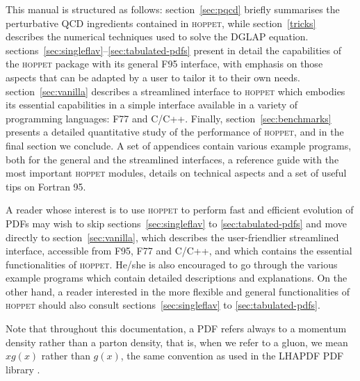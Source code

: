 \documentclass[12pt]{article}
\newcommand{\hoppet}{\textsc{hoppet}\xspace}
\begin{document}
This manual is structured as follows: section~\ref{sec:pqcd}
briefly summarises the perturbative QCD ingredients contained in
\hoppet, while section~\ref{tricks} describes the numerical techniques
used to solve the DGLAP equation. 
sections~\ref{sec:singleflav}--\ref{sec:tabulated-pdfs} present in detail the capabilities
of the \hoppet package with its general F95 interface, 
with emphasis on those aspects that
can be adapted by a user to tailor it to their own needs. 
section~\ref{sec:vanilla} describes a streamlined interface
to \hoppet which embodies its essential capabilities in
a simple interface available in a variety of programming languages: 
F77 and C/C++.
Finally, section~\ref{sec:benchmarks} presents a detailed 
quantitative study of
the performance of \hoppet, and in the final section we conclude.
A set of appendices contain various example programs,
both for the general and the streamlined interfaces, a reference
guide with the most important \hoppet modules,
details on technical aspects and a set of useful tips on
Fortran 95. 


A reader 
whose interest is to use \hoppet to perform
fast and efficient evolution of PDFs 
may wish to skip 
sections~\ref{sec:singleflav} to \ref{sec:tabulated-pdfs}
and move directly to
 section~\ref{sec:vanilla}, which describes the 
user-friendlier streamlined interface,
accessible from F95, F77 and C/C++, and which contains the essential
functionalities of \hoppet. He/she is also encouraged to go through the
various example programs which contain detailed 
descriptions and explanations. 
On the other hand, a reader interested in the
more flexible and general 
functionalities of \hoppet should also consult
sections~\ref{sec:singleflav} to \ref{sec:tabulated-pdfs}. 

Note 
that throughout this documentation, a PDF refers always to a momentum
density rather than a parton density, that is, when we refer to
a gluon, we mean $xg(x)$ rather than $g(x)$, the same convention
as used in the LHAPDF PDF library \cite{LHAPDF}.


\end{document}
